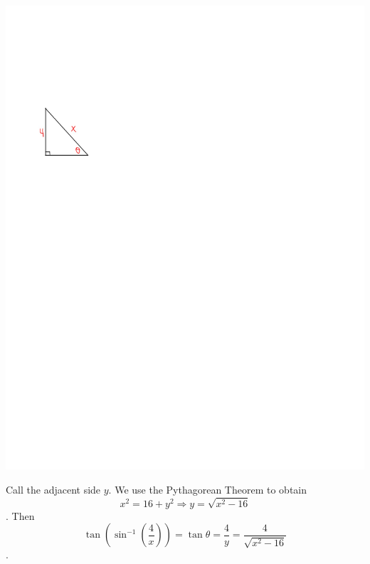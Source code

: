\documentclass[nooutcomes]{ximera}
\begin{document}
\begin{problem}
\begin{enumerate}
\begin{freeResponse}
			 \begin{image}
			 \includegraphics[trim=60 525 300 170]{Figure5.pdf}
			 \end{image}
			 Call the adjacent side $y$.  We use the Pythagorean Theorem to obtain
			$$x^2 = 16 + y^2 \Longrightarrow y = \sqrt{x^2 - 16}$$.
			Then
			$$ \tan \left( \sin^{-1} \left( \frac{4}{x} \right) \right) = \tan \theta = \frac{4}{y} = \frac{4}{\sqrt{x^2 - 16}}  $$.
			 \end{freeResponse}
			
			\end{enumerate}
			
\end{problem}
			
			
			

	










								
				
				
	
\end{document}
